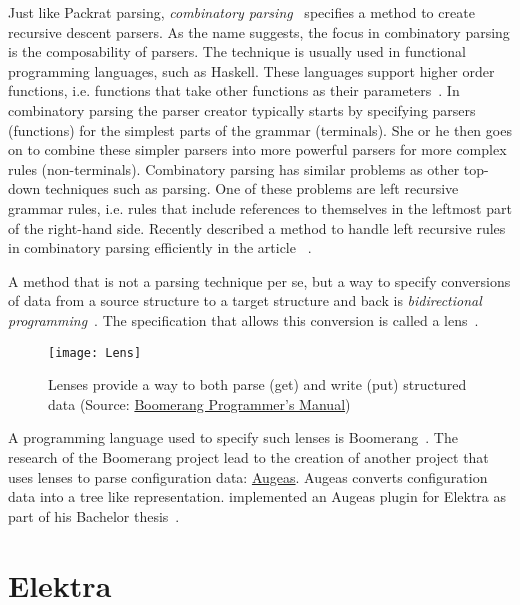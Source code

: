 Just like Packrat parsing, \emph{combinatory parsing}~\cite{frost1992constructing, hutton1992higher} specifies a method to create recursive descent parsers. As the name suggests, the focus in combinatory parsing is the composability of parsers. The technique is usually used in functional programming languages, such as Haskell. These languages support higher order functions, i.e. functions that take other functions as their parameters~\cite[p. 564]{grune2008parsing}. In combinatory parsing the parser creator typically starts by specifying parsers (functions) for the simplest parts of the grammar (terminals). She or he then goes on to combine these simpler parsers into more powerful parsers for more complex rules (non-terminals). Combinatory parsing has similar problems as other top-down techniques such as  parsing. One of these problems are left recursive grammar rules, i.e. rules that include references to themselves in the leftmost part of the right-hand side. Recently \citeauthor{frost2007modular} described a method to handle left recursive rules in combinatory parsing efficiently in the article ~\cite{frost2007modular}.

A method that is not a parsing technique per se, but a way to specify conversions of data from a source structure to a target structure and back is \emph{bidirectional programming}~\cite{foster2005combinators, bohannon2006relational}. The specification that allows this conversion is called a lens~\cite{foster2005combinators}.

\begin{figure}[H]
  \centering
    \texttt{[image: Lens]}
  \caption{Lenses provide a way to both parse (get) and write (put) structured data \newline (Source: \href{http://www.seas.upenn.edu/~harmony/manual.pdf}{Boomerang Programmer’s Manual})}
\end{figure}

A programming language used to specify such lenses is Boomerang~\cite{bohannon2008boomerang}. The research of the Boomerang project lead to the creation of another project that uses lenses to parse configuration data: \href{http://augeas.net}{Augeas}. Augeas converts configuration data into a tree like representation. \citeauthor{berlakovich2016universal} implemented an Augeas plugin for Elektra as part of his Bachelor thesis~\cite{berlakovich2016universal}.

\section{Elektra}

